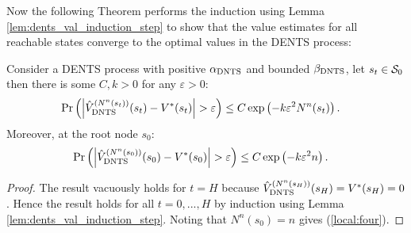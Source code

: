     \proofsep










    Now the following Theorem performs the induction using Lemma \ref{lem:dents_val_induction_step} to show that the value estimates for all reachable states converge to the optimal values in the DENTS process:
    \begin{theorem} \label{thrm:dents_val_converge}
        Consider a DENTS process with positive ${\alpha_{{\textnormal{DNTS}}}}$ and bounded ${\beta_{{\textnormal{DNTS}}}}$, let $s_t\in\mathcal{S}_0$ then there is some $C,k>0$ for any $\varepsilon>0$:
        \begin{align}
            \Pr\left(\left| {\hat{V}^{(N^n(s_{t}))}_{{\textnormal{DNTS}}}}(s_t) - V^*(s_{t}) \right| > \varepsilon \right) 
                &\leq C\exp\left( -k\varepsilon^2 N^n(s_{t}) \right).
        \end{align}
        Moreover, at the root node $s_0$:
        \begin{align}
            \Pr\left(\left| {\hat{V}^{(N^n(s_{0}))}_{{\textnormal{DNTS}}}}(s_0) - V^*(s_0) \right| > \varepsilon \right) 
                &\leq C\exp\left( -k\varepsilon^2 n \right). \label{local:four}
        \end{align}
    \end{theorem}
    \begin{proof}
        The result vacuously holds for $t=H$ because ${\hat{V}^{(N^n(s_H))}_{{\textnormal{DNTS}}}}(s_H)=V^*(s_H)=0$. Hence the result holds for all $t=0,...,H$ by induction using Lemma \ref{lem:dents_val_induction_step}. Noting that $N^n(s_0)=n$ gives (\ref{local:four}).
    \end{proof}

    \proofsep



    

